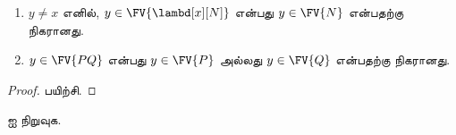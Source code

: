 \documentclass[../../../include/open-logic-section]{subfiles}
\begin{document}
\begin{lem}
  \begin{enumerate}
    \item {} $y \neq x$ எனில், $y \in
      \FV{\lambd[x][N]}$ என்பது $y \in \FV{N}$ என்பதற்கு நிகரானது.
    \item {} $y \in \FV{PQ}$ என்பது $y \in \FV{P}$
      அல்லது $y \in \FV{Q}$ என்பதற்கு நிகரானது.
    \end{enumerate}
\end{lem}

\begin{proof}
  பயிற்சி.
\end{proof}

\begin{prob}
   ஐ நிறுவுக.
\end{prob}
\end{document}
